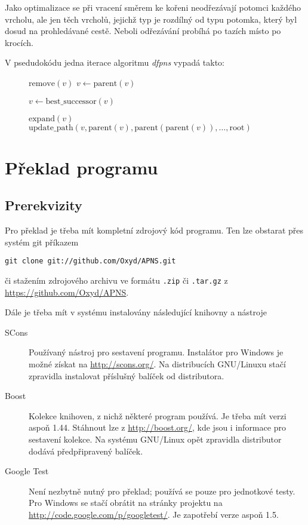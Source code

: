 \documentclass{article}
\begin{document}
Jako optimalizace se při vracení směrem ke kořeni neodřezávají potomci každého
vrcholu, ale jen těch vrcholů, jejichž typ je rozdílný od typu potomka, který
byl dosud na prohledávané cestě. Neboli odřezávání probíhá po tazích místo po
krocích.

V psedudokódu jedna iterace algoritmu \emph{dfpns} vypadá takto:
\begin{figure}[H]
\begin{algorithmic}
    \STATE {}
      \STATE \(\text{remove}(v)\)
    \ENDIF
    \STATE \(v \gets \text{parent}(v)\)
  \ENDWHILE
  
    \STATE \(v \gets \text{best\_successor}(v)\)
  \ENDWHILE
  
  \STATE \(\text{expand}(v)\)
  \STATE \(\text{update\_path}(v, \text{parent}(v), 
                               \text{parent}(\text{parent}(v)),
                               \ldots,
                               \text{root})\)
\end{algorithmic}
\end{figure}

\section{Překlad programu}
\label{sec:compiling}

\subsection{Prerekvizity}
Pro překlad je třeba mít kompletní zdrojový kód programu. Ten lze obstarat přes
systém git příkazem
\begin{center}\texttt{git clone git://github.com/Oxyd/APNS.git}\end{center} či
stažením zdrojového archivu ve formátu
\texttt{.zip} či \texttt{.tar.gz} z \url{https://github.com/Oxyd/APNS}.

Dále je třeba mít v systému instalovány následující knihovny a
nástroje\begin{description}
\item[SCons] Používaný nástroj pro sestavení programu. Instalátor pro Windows je
  možné získat na
  \url{http://scons.org/}. Na distribucích GNU/Linuxu stačí zpravidla instalovat 
  příslušný balíček od distributora.
\item[Boost] Kolekce knihoven, z nichž některé program používá. Je třeba mít
  verzi aspoň 1.44. Stáhnout lze z
  \url{http://boost.org/}, kde jsou i informace pro sestavení kolekce. Na 
  systému GNU/Linux opět zpravidla distributor dodává předpřipravený balíček.
\item[Google Test] Není nezbytně nutný pro překlad; používá se pouze pro
  jednotkové testy. Pro Windows se stačí obrátit na stránky projektu na
  \url{http://code.google.com/p/googletest/}. Je zapotřebí verze aspoň 1.5.
\end{description}
\end{document}
